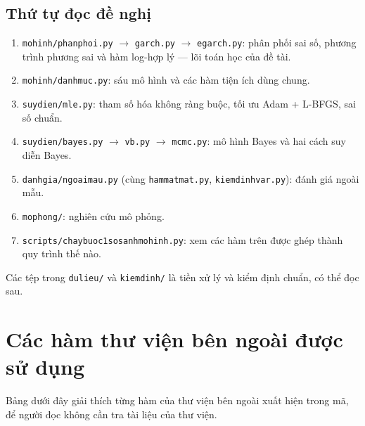 \documentclass[11pt,a4paper]{article}
\renewcommand{\_}{\gachduoi\allowbreak}
\newcommand{\tep}[1]{\texttt{#1}}
\begin{document}
\subsection{Thứ tự đọc đề nghị}
\begin{enumerate}
\item \tep{mo\_hinh/phan\_phoi.py} $\to$ \tep{garch.py} $\to$ \tep{egarch.py}: phân phối sai số, phương trình phương sai và hàm log-hợp lý — lõi toán học của đề tài.
\item \tep{mo\_hinh/danh\_muc.py}: sáu mô hình và các hàm tiện ích dùng chung.
\item \tep{suy\_dien/mle.py}: tham số hóa không ràng buộc, tối ưu Adam + L-BFGS, sai số chuẩn.
\item \tep{suy\_dien/bayes.py} $\to$ \tep{vb.py} $\to$ \tep{mcmc.py}: mô hình Bayes và hai cách suy diễn Bayes.
\item \tep{danh\_gia/ngoai\_mau.py} (cùng \tep{ham\_mat\_mat.py}, \tep{kiem\_dinh\_var.py}): đánh giá ngoài mẫu.
\item \tep{mo\_phong/}: nghiên cứu mô phỏng.
\item \tep{scripts/chay\_buoc1\_so\_sanh\_mo\_hinh.py}: xem các hàm trên được ghép thành quy trình thế nào.
\end{enumerate}
Các tệp trong \tep{du\_lieu/} và \tep{kiem\_dinh/} là tiền xử lý và kiểm định chuẩn, có thể đọc sau.

\section{Các hàm thư viện bên ngoài được sử dụng}\label{sec:api}
Bảng dưới đây giải thích từng hàm của thư viện bên ngoài xuất hiện trong mã, để người đọc không cần tra tài liệu của thư viện.
\end{document}
